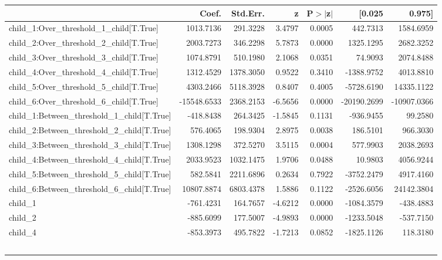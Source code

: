 \begin{subappendices}
\begin{table}[H]
{\begin{tabular}{lrrrrrr}
\toprule 
                                          &   Coef.    &  Std.Err.  &    z     & P$>$$|$z$|$ &    [0.025   &   0.975]    \\
\hline
\hline
child_1:Over_threshold_1_child[T.True]    &   1013.7136 &  291.3228 &  3.4797 &      0.0005 &    442.7313 &   1584.6959  \\
child_2:Over_threshold_2_child[T.True]    &   2003.7273 &  346.2298 &  5.7873 &      0.0000 &   1325.1295 &   2682.3252  \\
child_3:Over_threshold_3_child[T.True]    &   1074.8791 &  510.1980 &  2.1068 &      0.0351 &     74.9093 &   2074.8488  \\
child_4:Over_threshold_4_child[T.True]    &   1312.4529 & 1378.3050 &  0.9522 &      0.3410 &  -1388.9752 &   4013.8810  \\
child_5:Over_threshold_5_child[T.True]    &   4303.2466 & 5118.3928 &  0.8407 &      0.4005 &  -5728.6190 &  14335.1122  \\
child_6:Over_threshold_6_child[T.True]    & -15548.6533 & 2368.2153 & -6.5656 &      0.0000 & -20190.2699 & -10907.0366  \\
child_1:Between_threshold_1_child[T.True] &   -418.8438 &  264.3425 & -1.5845 &      0.1131 &   -936.9455 &     99.2580  \\
child_2:Between_threshold_2_child[T.True] &    576.4065 &  198.9304 &  2.8975 &      0.0038 &    186.5101 &    966.3030  \\
child_3:Between_threshold_3_child[T.True] &   1308.1298 &  372.5270 &  3.5115 &      0.0004 &    577.9903 &   2038.2693  \\
child_4:Between_threshold_4_child[T.True] &   2033.9523 & 1032.1475 &  1.9706 &      0.0488 &     10.9803 &   4056.9244  \\
child_5:Between_threshold_5_child[T.True] &    582.5841 & 2211.6896 &  0.2634 &      0.7922 &  -3752.2479 &   4917.4160  \\
child_6:Between_threshold_6_child[T.True] &  10807.8874 & 6803.4378 &  1.5886 &      0.1122 &  -2526.6056 &  24142.3804  \\
child_1                                   &   -761.4231 &  164.7657 & -4.6212 &      0.0000 &  -1084.3579 &   -438.4883  \\
child_2                                   &   -885.6099 &  177.5007 & -4.9893 &      0.0000 &  -1233.5048 &   -537.7150  \\
child_4                                   &   -853.3973 &  495.7822 & -1.7213 &      0.0852 &  -1825.1126 &    118.3180  \\
$$
\end{tabular}}
\end{table}
\end{subappendices}
